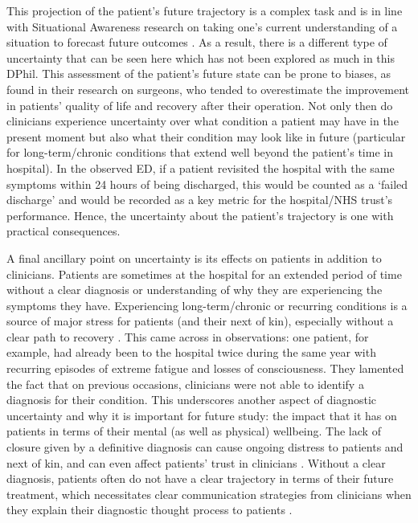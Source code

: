 \documentclass[a4paper, nobind]{templates/ociamthesis}
\begin{document}
\hfill\break
This projection of the patient's future trajectory is a complex task and is in line with Situational Awareness research on taking one's current understanding of a situation to forecast future outcomes \autocite{endsley_toward_1995}. As a result, there is a different type of uncertainty that can be seen here which has not been explored as much in this DPhil. This assessment of the patient's future state can be prone to biases, as \textcite{graz_prognosis_2005} found in their research on surgeons, who tended to overestimate the improvement in patients' quality of life and recovery after their operation. Not only then do clinicians experience uncertainty over what condition a patient may have in the present moment but also what their condition may look like in future (particular for long-term/chronic conditions that extend well beyond the patient's time in hospital). In the observed ED, if a patient revisited the hospital with the same symptoms within 24 hours of being discharged, this would be counted as a `failed discharge' and would be recorded as a key metric for the hospital/NHS trust's performance. Hence, the uncertainty about the patient's trajectory is one with practical consequences.

\hfill\break
A final ancillary point on uncertainty is its effects on patients in addition to clinicians. Patients are sometimes at the hospital for an extended period of time without a clear diagnosis or understanding of why they are experiencing the symptoms they have. Experiencing long-term/chronic or recurring conditions is a source of major stress for patients (and their next of kin), especially without a clear path to recovery \autocite{meyer2021}. This came across in observations: one patient, for example, had already been to the hospital twice during the same year with recurring episodes of extreme fatigue and losses of consciousness. They lamented the fact that on previous occasions, clinicians were not able to identify a diagnosis for their condition. This underscores another aspect of diagnostic uncertainty and why it is important for future study: the impact that it has on patients in terms of their mental (as well as physical) wellbeing. The lack of closure given by a definitive diagnosis can cause ongoing distress to patients and next of kin, and can even affect patients' trust in clinicians \autocite{bontempo2023}. Without a clear diagnosis, patients often do not have a clear trajectory in terms of their future treatment, which necessitates clear communication strategies from clinicians when they explain their diagnostic thought process to patients \autocite{dahm2023}.
\end{document}
